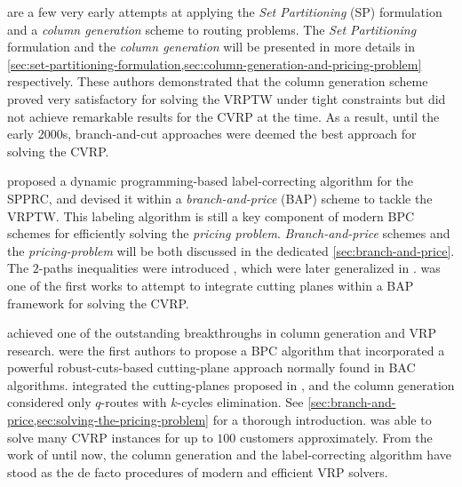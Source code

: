\Textcite{desrosiers1984, agarwal1989setpartitioningbased}
are a few very early attempts at applying the \textit{Set Partitioning} (SP) formulation
and a \textit{column generation} scheme to routing problems.
The \textit{Set Partitioning} formulation and the \textit{column generation}
will be  presented in more details in \cref{sec:set-partitioning-formulation,sec:column-generation-and-pricing-problem}
respectively.
These authors demonstrated that the column generation scheme proved very satisfactory
for solving the VRPTW under tight constraints
but did not achieve remarkable results for the CVRP at the time.
As a result, until the early 2000s,
branch-and-cut approaches were deemed the best approach for solving the CVRP.

\Textcite{desrochers1992}
proposed a dynamic programming-based label-correcting algorithm for the SPPRC,
and devised it within a \textit{branch-and-price} (BAP) scheme to tackle the VRPTW.
This labeling algorithm is still a key component of modern BPC schemes
for efficiently solving the \textit{pricing problem}.
\textit{Branch-and-price} schemes and the \textit{pricing-problem}
will be both discussed in the dedicated \cref{sec:branch-and-price}.
The $2$-paths inequalities were introduced \textcite{kohl1999},
which were later generalized in \textcite{desaulniers2008}.
\Textcite{kohl1999} was one of the first works to attempt
to integrate cutting planes within a BAP framework for solving the CVRP.

\Textcite{fukasawa2006} achieved one of the outstanding breakthroughs in column generation and VRP research.
 were the first authors to propose a BPC algorithm
that incorporated a powerful robust-cuts-based cutting-plane approach normally found in BAC algorithms.
\citeauthor{fukasawa2006} integrated the cutting-planes proposed in \cite{lysgaard2004},
and the column generation considered only $q$-routes with $k$-cycles elimination.
See \cref{sec:branch-and-price,sec:solving-the-pricing-problem} for a thorough introduction.
\textcite{fukasawa2006} was able to solve many CVRP instances for up to $100$ customers approximately.
From the work of \citeauthor{fukasawa2006} until now,
the column generation and the label-correcting algorithm
have stood as the de facto procedures of modern and efficient VRP solvers.

